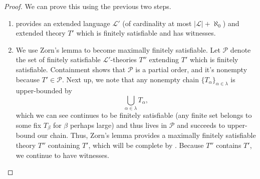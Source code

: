 \documentclass[../notes.tex]{subfiles}
\begin{document}
\begin{proof}
	We can prove this using the previous two steps.
	\begin{enumerate}
		\item {} provides an extended language $\mathcal L'$ (of cardinality at most $\left|\mathcal L\right|+\aleph_0$) and extended theory $T'$ which is finitely satisfiable and has witnesses.
		\item We use Zorn's lemma to become maximally finitely satisfiable. Let $\mathcal P$ denote the set of finitely satisfiable $\mathcal L'$-theories $T''$ extending $T'$ which is finitely satisfiable. Containment shows that $\mathcal P$ is a partial order, and it's nonempty because $T'\in\mathcal P$. Next up, we note that any nonempty chain $\{T_\alpha\}_{\alpha\in\lambda}$ is upper-bounded by
		\[\bigcup_{\alpha\in\lambda}T_\alpha,\]
		which we can see continues to be finitely satisfiable (any finite set belongs to some fix $T_\beta$ for $\beta$ perhaps large) and thus lives in $\mathcal P$ and succeeds to upper-bound our chain. Thus, Zorn's lemma provides a maximally finitely satisfiable theory $T''$ containing $T'$, which will be complete by . Because $T''$ contains $T'$, we continue to have witnesses.
		\qedhere
	\end{enumerate}
\end{proof}
\end{document}
